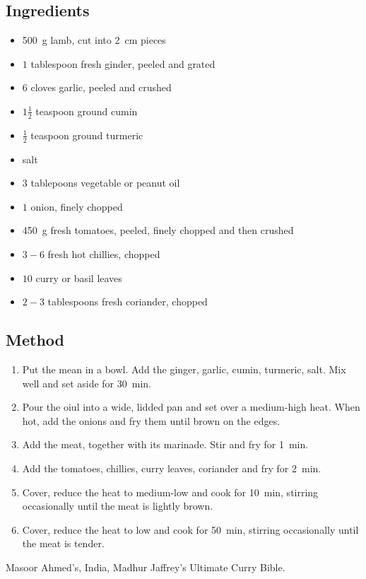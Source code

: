 \documentclass[11pt,a4paper]{article}
\begin{document}
\subsection*{Ingredients}

\begin{multicols}{2}

\begin{itemize}
  \item \qty{500}{\gram} lamb, cut into \qty{2}{\cm} pieces
  \item $ 1$ tablespoon fresh ginder, peeled and grated
  \item $ 6 $ cloves garlic, peeled and crushed
  \item $ 1 \frac{1}{2} $ teaspoon ground cumin
  \item $ \frac{1}{2} $ teaspoon ground turmeric
  \item salt
  \item $ 3 $ tablepoons vegetable or peanut oil
\end{itemize}

\columnbreak{}

\begin{itemize}
  \item $ 1 $ onion, finely chopped
  \item \qty{450}{\gram} fresh tomatoes, peeled, finely chopped and then crushed
  \item $ 3 - 6 $ fresh hot chillies, chopped
  \item $ 10 $ curry or basil leaves
  \item $ 2 - 3 $ tablespoons fresh coriander, chopped
\end{itemize}

\end{multicols}

\medskip

\subsection*{Method}

\begin{enumerate}
  \item Put the mean in a bowl. Add the ginger, garlic, cumin, turmeric, salt. Mix well and set aside for \qty{30}{\minute}.
  \item Pour the oiul into a wide, lidded pan and set over a medium-high heat. When hot, add the onions and fry them until brown on the edges.
  \item Add the meat, together with its marinade. Stir and fry for \qty{1}{\minute}.
  \item Add the tomatoes, chillies, curry leaves, coriander and fry for \qty{2}{\minute}.
  \item Cover, reduce the heat to medium-low and cook for \qty{10}{\minute}, stirring occasionally until the meat is lightly brown.
  \item Cover, reduce the heat to low and cook for \qty{50}{\minute}, stirring occasionally until the meat is tender.
\end{enumerate}

Masoor Ahmed's, India, Madhur Jaffrey's Ultimate Curry Bible.
\end{document}
